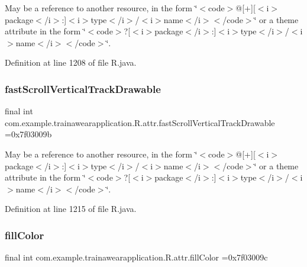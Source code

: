 May be a reference to another resource, in the form \char`\"{}$<$code$>$@\mbox{[}+\mbox{]}\mbox{[}$<$i$>$package$<$/i$>$\+:\mbox{]}$<$i$>$type$<$/i$>$/$<$i$>$name$<$/i$>$$<$/code$>$\char`\"{} or a theme attribute in the form \char`\"{}$<$code$>$?\mbox{[}$<$i$>$package$<$/i$>$\+:\mbox{]}$<$i$>$type$<$/i$>$/$<$i$>$name$<$/i$>$$<$/code$>$\char`\"{}. 

Definition at line 1208 of file R.\+java.

\mbox{\label{classcom_1_1example_1_1trainawearapplication_1_1_r_1_1attr_ace8664c2a8142938ecb7be31f0b37bd0}} 
\subsubsection{\texorpdfstring{fastScrollVerticalTrackDrawable}{fastScrollVerticalTrackDrawable}}
{\footnotesize\ttfamily final int com.\+example.\+trainawearapplication.\+R.\+attr.\+fast\+Scroll\+Vertical\+Track\+Drawable =0x7f03009b\hspace{0.3cm}{\ttfamily [static]}}

May be a reference to another resource, in the form \char`\"{}$<$code$>$@\mbox{[}+\mbox{]}\mbox{[}$<$i$>$package$<$/i$>$\+:\mbox{]}$<$i$>$type$<$/i$>$/$<$i$>$name$<$/i$>$$<$/code$>$\char`\"{} or a theme attribute in the form \char`\"{}$<$code$>$?\mbox{[}$<$i$>$package$<$/i$>$\+:\mbox{]}$<$i$>$type$<$/i$>$/$<$i$>$name$<$/i$>$$<$/code$>$\char`\"{}. 

Definition at line 1215 of file R.\+java.

\mbox{\label{classcom_1_1example_1_1trainawearapplication_1_1_r_1_1attr_aa74823ed58427f8552e21011e687097f}} 
\subsubsection{\texorpdfstring{fillColor}{fillColor}}
{\footnotesize\ttfamily final int com.\+example.\+trainawearapplication.\+R.\+attr.\+fill\+Color =0x7f03009c\hspace{0.3cm}{\ttfamily [static]}}


